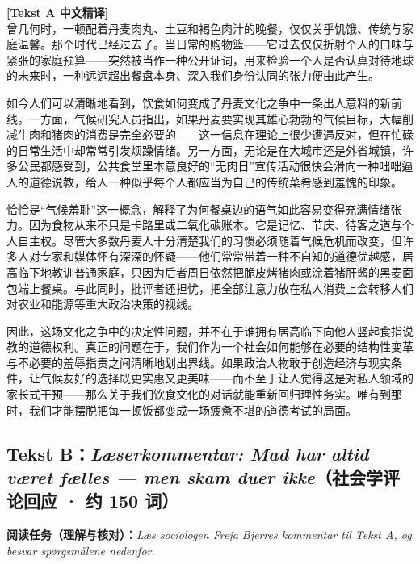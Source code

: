 \begin{transbox}
\small
\textbf{\color{NCDTeal}[Tekst A 中文精译]}\\
曾几何时，一顿配着丹麦肉丸、土豆和褐色肉汁的晚餐，仅仅关乎饥饿、传统与家庭温馨。那个时代已经过去了。当日常的购物篮——它过去仅仅折射个人的口味与紧张的家庭预算——突然被当作一种公开证词，用来检验一个人是否认真对待地球的未来时，一种远远超出餐盘本身、深入我们身份认同的张力便由此产生。

如今人们可以清晰地看到，饮食如何变成了丹麦文化之争中一条出人意料的新前线。一方面，气候研究人员指出，如果丹麦要实现其雄心勃勃的气候目标，大幅削减牛肉和猪肉的消费是完全必要的——这一信息在理论上很少遭遇反对，但在忙碌的日常生活中却常常引发烦躁情绪。另一方面，无论是在大城市还是外省城镇，许多公民都感受到，公共食堂里本意良好的“无肉日”宣传活动很快会滑向一种咄咄逼人的道德说教，给人一种似乎每个人都应当为自己的传统菜肴感到羞愧的印象。

恰恰是“气候羞耻”这一概念，解释了为何餐桌边的语气如此容易变得充满情绪张力。因为食物从来不只是卡路里或二氧化碳账本。它是记忆、节庆、待客之道与个人自主权。尽管大多数丹麦人十分清楚我们的习惯必须随着气候危机而改变，但许多人对专家和媒体怀有深深的怀疑——他们常常带着一种不自知的道德优越感，居高临下地教训普通家庭，只因为后者周日依然把脆皮烤猪肉或涂着猪肝酱的黑麦面包端上餐桌。与此同时，批评者还担忧，把全部注意力放在私人消费上会转移人们对农业和能源等重大政治决策的视线。

因此，这场文化之争中的决定性问题，并不在于谁拥有居高临下向他人竖起食指说教的道德权利。真正的问题在于，我们作为一个社会如何能够在必要的结构性变革与不必要的羞辱指责之间清晰地划出界线。如果政治人物敢于创造经济与现实条件，让气候友好的选择既更实惠又更美味——而不至于让人觉得这是对私人领域的家长式干预——那么关于我们饮食文化的对话就能重新回归理性务实。唯有到那时，我们才能摆脱把每一顿饭都变成一场疲惫不堪的道德考试的局面。
\end{transbox}

\subsection*{Tekst B：\textit{Læserkommentar: Mad har altid været fælles --- men skam duer ikke}（社会学评论回应 · 约 150 词）}

\textbf{阅读任务（理解与核对）：}\textit{Læs sociologen Freja Bjerres kommentar til Tekst A, og besvar spørgsmålene nedenfor.}

